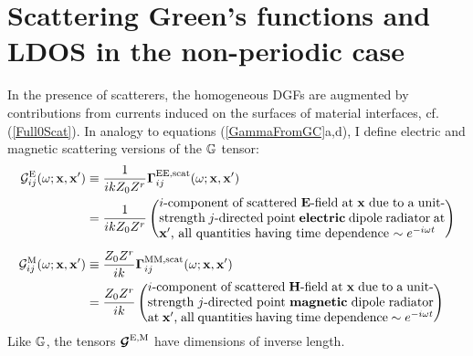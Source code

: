 \documentclass[letterpaper]{article}
\begin{document}
\newpage
\section{Scattering Green's functions and LDOS in the non-periodic case}

In the presence of scatterers, the homogeneous DGFs are augmented
by contributions from currents induced on the surfaces of
material interfaces, cf. (\ref{Full0Scat}). In analogy to equations
(\ref{GammaFromGC}a,d), I define electric and magnetic
scattering versions of the $\mathbb{G}$ tensor:
\begin{align*}
 \mc G_{ij}\supt{E}(\omega; \vb x, \vb x^\prime)
 &\equiv
  \frac{1}{ikZ_0 Z^r}\vbGamma\supt{EE,scat}_{ij}(\omega; \vb x, \vb x^\prime) 
\\
 &=\frac{1}{ikZ_0 Z^r}
   \left( \parbox{0.65\textwidth}
    { $i$-component of scattered $\vb E$-field at $\vb x$
      due to a unit-strength $j$-directed point \textbf{electric} 
      dipole radiator
      at $\vb x^\prime$, all quantities having time dependence
      $\sim e^{-i\omega t}$
    }
   \right)
\\[5pt]
 \mc G_{ij}\supt{M}(\omega; \vb x, \vb x^\prime)
  &\equiv
   \frac{Z_0 Z^r}{ik}\vbGamma\supt{MM,scat}_{ij}(\omega; \vb x, \vb x^\prime) 
\\
  &=\frac{Z_0 Z^r}{ik}
   \left( \parbox{0.65\textwidth}
    { $i$-component of scattered $\vb H$-field at $\vb x$
      due to a unit-strength $j$-directed point \textbf{magnetic}
      dipole radiator
      at $\vb x^\prime$, all quantities having time dependence
      $\sim e^{-i\omega t}$
    }
   \right)
\end{align*}
Like $\mathbb{G}$, the tensors $\boldsymbol{\mathcal{G}}^{\text{\scriptsize E,M}}$ have dimensions of inverse
length.
\end{document}
